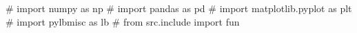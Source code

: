 \documentclass{article}
\begin{document}
\title{ {{}} }
\maketitle
\tableofcontents

\begin{pycode}
# import numpy as np
# import pandas as pd
# import matplotlib.pyplot as plt
# import pylbmisc as lb
# from src.include import fun
\end{pycode}




\printbibliography 
\end{document}
